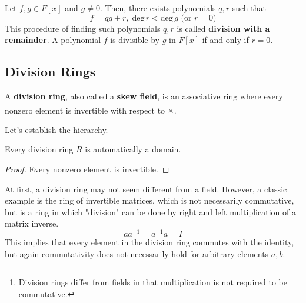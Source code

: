   \begin{theorem}
    Let $f, g \in F[x]$ and $g \neq 0$. Then, there exists polynomials $q, r$ such that 
    \begin{equation}
      f = q g + r, \; \text{deg}\, r < \text{deg}\, g \text{ (or } r = 0 \text{)}
    \end{equation}
    This procedure of finding such polynomials $q, r$ is called \textbf{division with a remainder}. A polynomial $f$ is divisible by $g$ in $F[x]$ if and only if $r = 0$. 
  \end{theorem}

  \begin{theorem}
    
  \end{theorem}

\subsection{Division Rings}

  \begin{definition}
    A \textbf{division ring}, also called a \textbf{skew field}, is an associative ring where every nonzero element is invertible with respect to $\times$.\footnote{Division rings differ from fields in that multiplication is not required to be commutative. }
  \end{definition}

  Let's establish the hierarchy. 

  \begin{lemma}
    Every division ring $R$ is automatically a domain. 
  \end{lemma}
  \begin{proof}
    Every nonzero element is invertible. 
  \end{proof}

  \begin{example}
    At first, a division ring may not seem different from a field. However, a classic example is the ring of invertible matrices, which is not necessarily commutative, but is a ring in which "division" can be done by right and left multiplication of a matrix inverse. 
    \begin{equation}
      a a^{-1} = a^{-1} a = I
    \end{equation}
    This implies that every element in the division ring commutes with the identity, but again commutativity does not necessarily hold for arbitrary elements $a, b$. 
  \end{example} 


